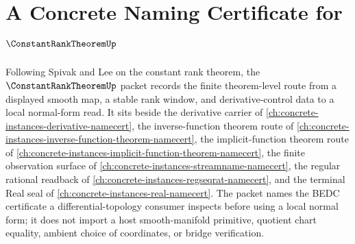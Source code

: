 \chapter{A Concrete Naming Certificate for $\ConstantRankTheoremUp$}
\label{ch:concrete-instances-constant-rank-theorem-namecert}

Following Spivak and Lee on the constant rank theorem, the $\ConstantRankTheoremUp$ packet records the finite theorem-level route from a displayed smooth map, a stable rank window, and derivative-control data to a local normal-form read. It sits beside the derivative carrier of \autoref{ch:concrete-instances-derivative-namecert}, the inverse-function theorem route of \autoref{ch:concrete-instances-inverse-function-theorem-namecert}, the implicit-function theorem route of \autoref{ch:concrete-instances-implicit-function-theorem-namecert}, the finite observation surface of \autoref{ch:concrete-instances-streamname-namecert}, the regular rational readback of \autoref{ch:concrete-instances-regseqrat-namecert}, and the terminal Real seal of \autoref{ch:concrete-instances-real-namecert}. The packet names the BEDC certificate a differential-topology consumer inspects before using a local normal form; it does not import a host smooth-manifold primitive, quotient chart equality, ambient choice of coordinates, or bridge verification.

